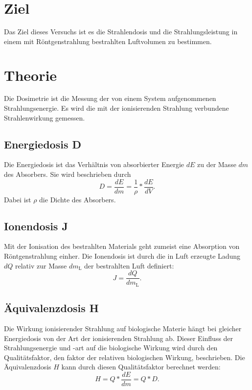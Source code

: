 \section{Ziel}
Das Ziel dieses Versuchs ist es die Strahlendosis und die
Strahlungsleistung in einem mit Röntgenstrahlung bestrahlten
Luftvolumen zu bestimmen.

\section{Theorie}
\label{sec:Theorie}

Die Dosimetrie ist die Messung der von einem System
aufgenommenen Strahlungsenergie.
Es wird die mit der ionisierenden Strahlung
verbundene Strahlenwirkung gemessen.

\subsection{Energiedosis D}
Die Energiedosis ist das Verhältnis von absorbierter
Energie $dE$ zu der Masse $dm$ des Absorbers.
Sie wird beschrieben durch
\begin{equation*}
    D = \frac{dE}{dm} = \frac{1}{\rho} * \frac{dE}{dV}.
    \label{eqn:Energiedosis}
\end{equation*}
Dabei ist $\rho$ die Dichte des Absorbers.

\subsection{Ionendosis J}
Mit der Ionisation des bestrahlten Materials geht zumeist
eine Absorption von Röntgenstrahlung einher. %
Die Ionendosis ist durch die in Luft erzeugte Ladung $dQ$
relativ zur Masse $dm_\text{L}$ der bestrahlten Luft definiert:
\begin{equation*}
    J = \frac{dQ}{dm_\text{L}}.
    \label{eqn:Ionendosis}
\end{equation*}

\subsection{Äquivalenzdosis H}
Die Wirkung ionisierender Strahlung auf biologische Materie
hängt bei gleicher Energiedosis von der Art der ionisierenden
Strahlung ab. Dieser Einfluss der Strahlungsenergie und -art
auf die biologische Wirkung wird durch den Qualitätsfaktor,
den faktor der relativen biologischen Wirkung,
beschrieben.
Die Äquivalenzdosis $H$ kann durch diesen Qualitätsfaktor
berechnet werden:
\begin{equation*}
    H = Q * \frac{dE}{dm} = Q * D.
    \label{eqn:Aequivalenzdosis}
\end{equation*}

